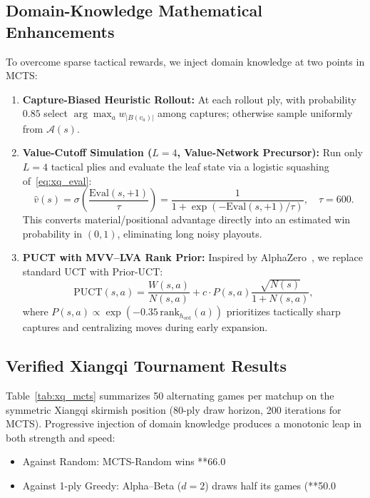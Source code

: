 \documentclass[conference]{IEEEtran}
\begin{document}
\subsection{Domain-Knowledge Mathematical Enhancements}
To overcome sparse tactical rewards, we inject domain knowledge at two points in MCTS:
\begin{enumerate}
    \item \textbf{Capture-Biased Heuristic Rollout:} At each rollout ply, with probability $0.85$ select $\arg\max_{a} w_{|B(v_a)|}$ among captures; otherwise sample uniformly from $\mathcal{A}(s)$.
    \item \textbf{Value-Cutoff Simulation ($L=4$, Value-Network Precursor):} Run only $L=4$ tactical plies and evaluate the leaf state via a logistic squashing of~\eqref{eq:xq_eval}:
    \begin{equation}
    \hat{v}(s) = \sigma\!\left(\frac{\mathrm{Eval}(s, +1)}{\tau}\right) = \frac{1}{1 + \exp\!\left(-\mathrm{Eval}(s, +1)/\tau\right)}, \quad \tau = 600.
    \end{equation}
    This converts material/positional advantage directly into an estimated win probability in $(0,1)$, eliminating long noisy playouts.
    \item \textbf{PUCT with MVV--LVA Rank Prior:} Inspired by AlphaZero~\cite{silver2017}, we replace standard UCT with Prior-UCT:
    \begin{equation}
    \mathrm{PUCT}(s, a) = \frac{W(s,a)}{N(s,a)} + c \cdot P(s, a) \frac{\sqrt{N(s)}}{1 + N(s,a)},
    \end{equation}
    where $P(s, a) \propto \exp(-0.35\,\mathrm{rank}_{h_{\text{ord}}}(a))$ prioritizes tactically sharp captures and centralizing moves during early expansion.
\end{enumerate}

\subsection{Verified Xiangqi Tournament Results}
Table~\ref{tab:xq_mcts} summarizes 50 alternating games per matchup on the symmetric Xiangqi skirmish position (80-ply draw horizon, 200 iterations for MCTS). Progressive injection of domain knowledge produces a monotonic leap in both strength and speed:
\begin{itemize}
    \item Against Random: MCTS-Random wins **66.0%
    \item Against 1-ply Greedy: Alpha--Beta ($d=2$) draws half its games (**50.0%
\end{itemize}
\end{document}
